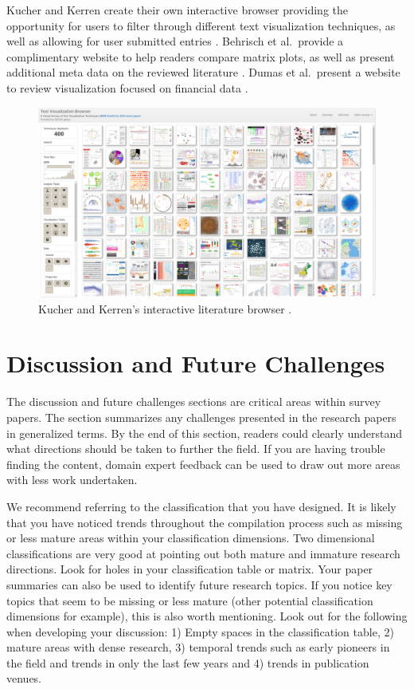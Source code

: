 Kucher and Kerren create their own interactive browser providing the opportunity for users to filter through different text visualization techniques, as well as allowing for user submitted entries \cite{kucher2015text}. Behrisch et al.\ provide a complimentary website to help readers compare matrix plots, as well as present additional meta data on the reviewed literature \cite{matrixreorderingVis}. Dumas et al.\ present a website to review visualization focused on financial data \cite{dumas2014financevis}.

\begin{figure}[t]
\centering
\includegraphics[width=1\linewidth]{pictures/kucherkerren.png}
\caption{Kucher and Kerren's interactive literature browser . 
 \cite{kucher2015text}} \label{fig:bar}
\end{figure}

\section{Discussion and Future Challenges} \label{sec:fut}
The discussion and future challenges sections are critical areas within survey papers. The section summarizes any challenges presented in the research papers in generalized terms. By the end of this section, readers could clearly understand what directions should be taken to further the field. If you are having trouble finding the content, domain expert feedback can be used to draw out more areas with less work undertaken.

We recommend referring to the classification that you have designed. It is likely that you have noticed trends throughout the compilation process such as missing or less mature areas within your classification dimensions. Two dimensional classifications are very good at pointing out both mature and immature research directions. Look for holes in your classification table or matrix. Your paper summaries can also be used to identify future research topics. If you notice key topics that seem to be missing or less mature (other potential classification dimensions for example), this is also worth mentioning. Look out for the following when developing your discussion: 1) Empty spaces in the classification table, 2) mature areas with dense research, 3) temporal trends such as early pioneers in the field and trends in only the last few years and 4) trends in publication venues.

